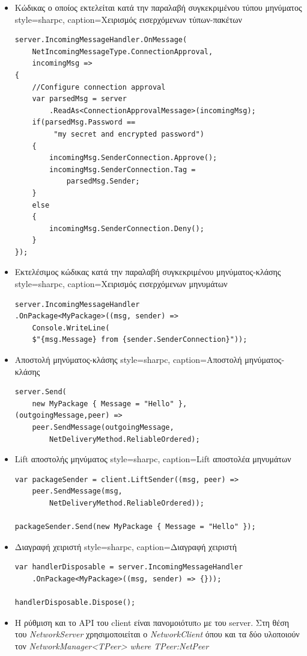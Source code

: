 \begin{itemize}
		\item Κώδικας ο οποίος εκτελείται κατά την παραλαβή συγκεκριμένου τύπου μηνύματος
	\lstset
	{
		style=sharpc, 
		caption={Χειρισμός εισερχόμενων τύπων-πακέτων}
	}
		\begin{lstlisting}
server.IncomingMessageHandler.OnMessage(
	NetIncomingMessageType.ConnectionApproval, 
	incomingMsg =>
{
	//Configure connection approval
	var parsedMsg = server
		.ReadAs<ConnectionApprovalMessage>(incomingMsg);
	if(parsedMsg.Password ==
		 "my secret and encrypted password")
	{
		incomingMsg.SenderConnection.Approve();
		incomingMsg.SenderConnection.Tag = 
			parsedMsg.Sender;
	}
	else
	{
		incomingMsg.SenderConnection.Deny();
	}
});
		\end{lstlisting}
		\item Εκτελέσιμος κώδικας κατά την παραλαβή συγκεκριμένου μηνύματος-κλάσης
	\lstset
	{
		style=sharpc, 
		caption={Χειρισμός εισερχόμενων μηνυμάτων}
	}
		\begin{lstlisting}
server.IncomingMessageHandler
.OnPackage<MyPackage>((msg, sender) => 
	Console.WriteLine(
	$"{msg.Message} from {sender.SenderConnection}"));
		\end{lstlisting}	
		\item Αποστολή μηνύματος-κλάσης
		\lstset
		{
			style=sharpc, 
			caption={Αποστολή μηνύματος-κλάσης}
		}
		\begin{lstlisting}
server.Send(
	new MyPackage { Message = "Hello" },
(outgoingMessage,peer) => 
	peer.SendMessage(outgoingMessage,
		NetDeliveryMethod.ReliableOrdered);
		\end{lstlisting}		
		\item Lift αποστολής μηνύματος
	\lstset
	{
		style=sharpc, 
		caption={Lift αποστολέα μηνυμάτων}
	}
		\begin{lstlisting}
var packageSender = client.LiftSender((msg, peer) =>
	peer.SendMessage(msg, 
		NetDeliveryMethod.ReliableOrdered));
		
packageSender.Send(new MyPackage { Message = "Hello" });	
		\end{lstlisting}	
		\item Διαγραφή χειριστή
	\lstset
	{
		style=sharpc, 
		caption={Διαγραφή χειριστή}
	}
		\begin{lstlisting}	
var handlerDisposable = server.IncomingMessageHandler
	.OnPackage<MyPackage>((msg, sender) => {}));
		
handlerDisposable.Dispose();	
		\end{lstlisting}		
		\item Η ρύθμιση και το API του client είναι πανομοιότυπo με του server. Στη θέση του \textit{NetworkServer} χρησιμοποιείται ο \textit{NetworkClient} όπου και τα δύο υλοποιούν τον \textit{NetworkManager<TPeer> where TPeer:NetPeer}		
	\end{itemize}
	
